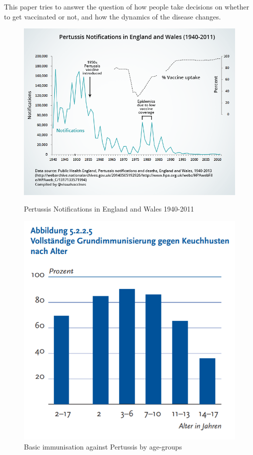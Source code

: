 \documentclass[11pt]{article}
\begin{document}
This paper tries to answer the question of how people take decisions on whether to get vaccinated or not, and how the dynamics of the disease changes. 

\begin{figure}
\centering
\begin{minipage}{.6\textwidth}
  \centering
  \includegraphics[height=0.7\linewidth]{ukpertussis}
  \caption{Pertussis Notifications in England \break
  and Wales 1940-2011}  
  \label{fig:1}
  
\end{minipage}%
\begin{minipage}{.4\textwidth}
  \centering
  \includegraphics[height=1\linewidth]{grundimmodeutschlandpertussis}
  \caption{Basic immunisation against Pertussis by age-groups}
  \label{fig:2}
 
\end{minipage}%
\end{figure}
\end{document}
